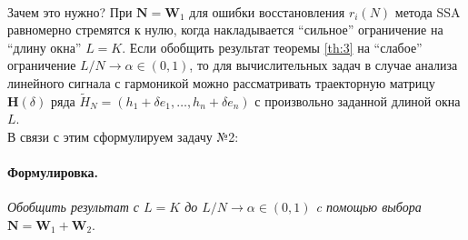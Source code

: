 \documentclass[specialist,
               substylefile = spbu_report.rtx,
               subf,href,colorlinks=true, 12pt]{disser}
\newenvironment{formulation}{\paragraph{Формулировка.}}{\hfill}
\begin{document}
\\
Зачем это нужно? При $\mathbf{N} = \mathbf{W}_1$ для ошибки восстановления $r_i(N)$ метода SSA равномерно стремятся к нулю, когда накладывается ``сильное'' ограничение на ``длину окна'' $L = K$. Если обобщить результат теоремы \eqref{th:3} на ``слабое'' ограничение $L/N\rightarrow\alpha\in(0,1)$, то для вычислительных задач в случае анализа линейного сигнала с гармоникой можно рассматривать траекторную матрицу $\mathbf{H}(\delta)$ ряда $\widetilde{H}_N=(h_1 + \delta e_1, \dots, h_n+\delta e_n)$ с произвольно заданной длиной окна $L$.
\\
В связи с этим сформулируем задачу №2:
\begin{formulation}
\emph{Обобщить результат \cite{ZNekrutkin} с $L=K$ до $L/N\to \alpha \in (0,1)$ c помощью выбора $\mathbf{N}=\mathbf{W}_1+\mathbf{W}_2$}.
\end{formulation}
\end{document}
